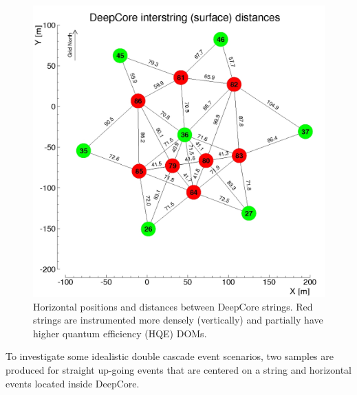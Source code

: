 
\begin{figure}[h]
    \centering
    \includegraphics{figures/icecube_deepcore/deepcore_surface_distances.jpg}
    \caption[DeepCore string spacing]{Horizontal positions and distances between DeepCore strings. Red strings are instrumented more densely (vertically) and partially have higher quantum efficiency (HQE) DOMs.}
\end{figure}

To investigate some idealistic double cascade event scenarios, two samples are produced for straight up-going events that are centered on a string and horizontal events located inside DeepCore.

